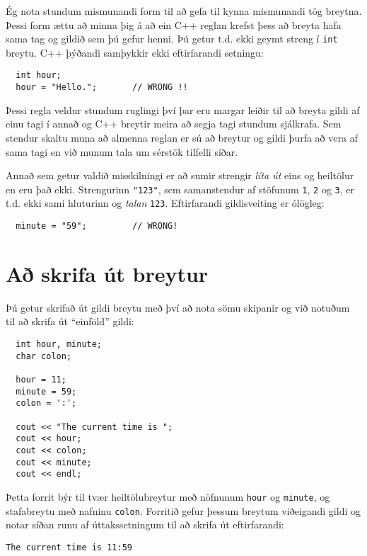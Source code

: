 \vspace{0.1in}
\centerline{}
\vspace{0.1in}

Ég nota stundum mismunandi form til að gefa til kynna mismunandi tög breytna.
Þessi form ættu að minna þig á að ein C++ reglan krefst þess að breyta hafa sama tag og gildið sem þú gefur henni.
Þú getur t.d. ekki geymt streng í {\tt int} breytu.
C++ þýðandi samþykkir ekki eftirfarandi setningu: 

\begin{verbatim}
  int hour;
  hour = "Hello.";       // WRONG !!
\end{verbatim}
%
Þessi regla veldur stundum ruglingi því þar eru margar leiðir til að breyta gildi af einu tagi í annað og C++ breytir meira að segja tagi stundum sjálkrafa.
Sem stendur skaltu muna að almenna reglan er sú að breytur og gildi þurfa að vera af sama tagi en við munum tala um sérstök tilfelli síðar.

Annað sem getur valdið misskilningi er að sumir strengir {\em líta út} eins og heiltölur en eru það ekki.
Strengurinn {\tt "123"}, sem samanstendur af stöfunum {\tt 1}, {\tt 2} og {\tt 3}, er t.d. ekki sami hluturinn og {\em talan} {\tt 123}.
Eftirfarandi gildisveiting er ólögleg:

\begin{verbatim}
  minute = "59";         // WRONG!
\end{verbatim}
%
\section{Að skrifa út breytur}
\label{output}

Þú getur skrifað út gildi breytu með því að nota sömu skipanir og við notuðum til að skrifa út ``einföld'' gildi:

\begin{verbatim}
  int hour, minute;
  char colon;

  hour = 11;
  minute = 59;
  colon = ':';

  cout << "The current time is ";
  cout << hour;
  cout << colon;
  cout << minute;
  cout << endl;
\end{verbatim}
%
Þetta forrit býr til tvær heiltölubreytur með nöfnunum {\tt hour} og {\tt minute}, og stafabreytu með nafninu {\tt colon}.
Forritið gefur þessum breytum viðeigandi gildi og notar síðan runu af úttakssetningum til að skrifa út eftirfarandi: 

\begin{verbatim}
The current time is 11:59
\end{verbatim}


